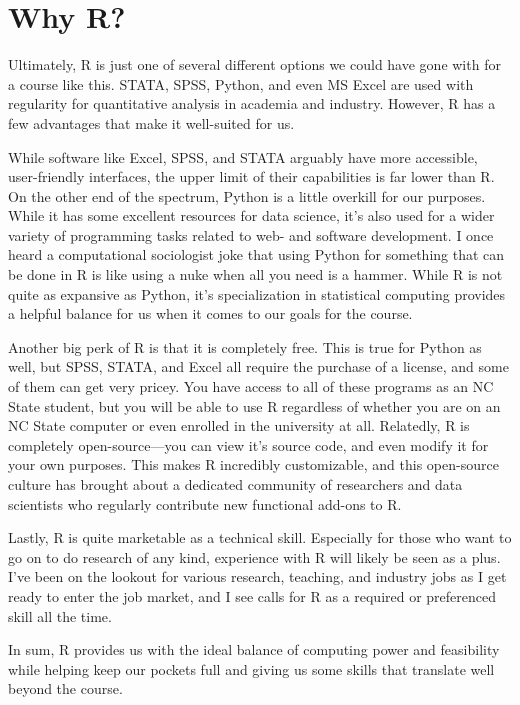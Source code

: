 \documentclass[
  letterpaper,
  DIV=11,
  numbers=noendperiod]{scrreprt}
\begin{document}
\section*{Why R?}\label{why-r}


Ultimately, R is just one of several different options we could have
gone with for a course like this. STATA, SPSS, Python, and even MS Excel
are used with regularity for quantitative analysis in academia and
industry. However, R has a few advantages that make it well-suited for
us.

While software like Excel, SPSS, and STATA arguably have more
accessible, user-friendly interfaces, the upper limit of their
capabilities is far lower than R. On the other end of the spectrum,
Python is a little overkill for our purposes. While it has some
excellent resources for data science, it's also used for a wider variety
of programming tasks related to web- and software development. I once
heard a computational sociologist joke that using Python for something
that can be done in R is like using a nuke when all you need is a
hammer. While R is not quite as expansive as Python, it's specialization
in statistical computing provides a helpful balance for us when it comes
to our goals for the course.

Another big perk of R is that it is completely free. This is true for
Python as well, but SPSS, STATA, and Excel all require the purchase of a
license, and some of them can get very pricey. You have access to all of
these programs as an NC State student, but you will be able to use R
regardless of whether you are on an NC State computer or even enrolled
in the university at all. Relatedly, R is completely open-source---you
can view it's source code, and even modify it for your own purposes.
This makes R incredibly customizable, and this open-source culture has
brought about a dedicated community of researchers and data scientists
who regularly contribute new functional add-ons to R.

Lastly, R is quite marketable as a technical skill. Especially for those
who want to go on to do research of any kind, experience with R will
likely be seen as a plus. I've been on the lookout for various research,
teaching, and industry jobs as I get ready to enter the job market, and
I see calls for R as a required or preferenced skill all the time.

In sum, R provides us with the ideal balance of computing power and
feasibility while helping keep our pockets full and giving us some
skills that translate well beyond the course.
\end{document}
